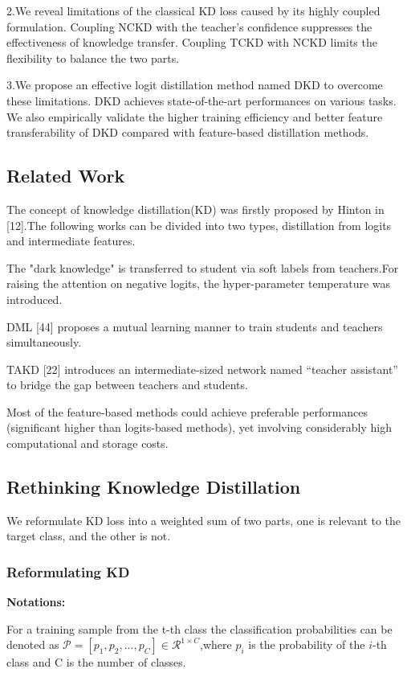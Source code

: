 \documentclass[11pt]{article}
\begin{document}
2.We reveal limitations of the classical KD loss caused by its highly coupled formulation. Coupling NCKD with the teacher’s confidence suppresses the effectiveness of knowledge transfer. Coupling TCKD with NCKD limits the flexibility to balance the two parts.

3.We propose an effective logit distillation method named DKD to overcome these limitations. DKD achieves state-of-the-art performances on various tasks. We also empirically validate the higher training efficiency and better feature transferability of DKD compared with feature-based distillation methods.

\subsection{Related Work}
The concept of knowledge distillation(KD) was firstly proposed by Hinton in [12].The following works can be divided into two types, distillation from logits and intermediate features.

The "dark knowledge" is transferred to student via soft labels from teachers.For raising the attention on negative logits, the hyper-parameter temperature was introduced.

DML [44] proposes a mutual learning manner to train students and teachers simultaneously.
 
TAKD [22] introduces an intermediate-sized network named “teacher assistant” to bridge the gap between teachers and students.

Most of the feature-based methods could achieve preferable performances (significant higher than logits-based methods), yet involving considerably high
computational and storage costs.

\subsection{Rethinking Knowledge Distillation}
We reformulate KD loss into a weighted sum of two parts, one is relevant to the target class, and the other is not.

\subsubsection{Reformulating KD}
\textbf{Notations:}

For a training sample from the t-th class the classification probabilities can be denoted as $\mathcal{P} = [p_1,p_2,...,p_C]\in \mathcal{R}^{1\times C}$,where $p_i$ is the probability of the $i$-th class and C is the number of classes.
\end{document}
